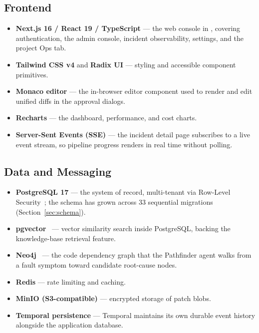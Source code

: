 \subsection{Frontend}

\begin{itemize}[itemsep=2pt]
  \item \textbf{Next.js 16 / React 19 / TypeScript} --- the web console in
        , covering authentication, the admin console, incident
        observability, settings, and the project Ops tab.
  \item \textbf{Tailwind CSS v4} and \textbf{Radix UI} --- styling and
        accessible component primitives.
  \item \textbf{Monaco editor} --- the in-browser editor component used to
        render and edit unified diffs in the approval dialogs.
  \item \textbf{Recharts} --- the dashboard, performance, and cost charts.
  \item \textbf{Server-Sent Events (SSE)} --- the incident detail page
        subscribes to a live event stream, so pipeline progress renders in
        real time without polling.
\end{itemize}

\subsection{Data and Messaging}

\begin{itemize}[itemsep=2pt]
  \item \textbf{PostgreSQL 17} --- the system of record, multi-tenant via
        Row-Level Security~\cite{pgrls}; the schema has grown across 33
        sequential migrations (Section~\ref{sec:schema}).
  \item \textbf{pgvector}~\cite{pgvector} --- vector similarity search inside
        PostgreSQL, backing the knowledge-base retrieval feature.
  \item \textbf{Neo4j}~\cite{neo4j} --- the code dependency graph that the
        Pathfinder agent walks from a fault symptom toward candidate
        root-cause nodes.
  \item \textbf{Redis} --- rate limiting and caching.
  \item \textbf{MinIO (S3-compatible)} --- encrypted storage of patch blobs.
  \item \textbf{Temporal persistence} --- Temporal maintains its own durable
        event history alongside the application database.
\end{itemize}

